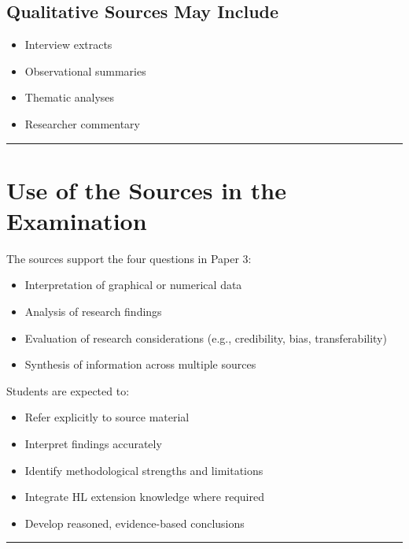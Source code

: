 \documentclass[12pt,a4paper]{article}
\begin{document}
\subsection*{Qualitative Sources May Include}

\begin{itemize}
    \item Interview extracts
    \item Observational summaries
    \item Thematic analyses
    \item Researcher commentary
\end{itemize}

\vspace{1em}
\hrule
\vspace{1em}

\section*{Use of the Sources in the Examination}

The sources support the four questions in Paper 3:

\begin{itemize}
    \item Interpretation of graphical or numerical data
    \item Analysis of research findings
    \item Evaluation of research considerations (e.g., credibility, bias, transferability)
    \item Synthesis of information across multiple sources
\end{itemize}

Students are expected to:

\begin{itemize}
    \item Refer explicitly to source material
    \item Interpret findings accurately
    \item Identify methodological strengths and limitations
    \item Integrate HL extension knowledge where required
    \item Develop reasoned, evidence-based conclusions
\end{itemize}

\vspace{1em}
\hrule
\vspace{1em}
\end{document}
